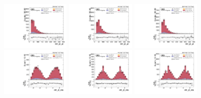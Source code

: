 \begin{figure}[!ht]
  \centering
  \includegraphics[width=0.30\textwidth]{analysis_plots/2016_zjj/cr_vjets_l/vbf_j2_pt.pdf}
  \includegraphics[width=0.30\textwidth]{analysis_plots/2017_zjj/cr_vjets_l/vbf_j2_pt.pdf}
  \includegraphics[width=0.30\textwidth]{analysis_plots/2018_zjj/cr_vjets_l/vbf_j2_pt.pdf} \\
  \includegraphics[width=0.30\textwidth]{analysis_plots/2016_zjj/cr_vjets_l/vbf_j2_eta.pdf}
  \includegraphics[width=0.30\textwidth]{analysis_plots/2017_zjj/cr_vjets_l/vbf_j2_eta.pdf}
  \includegraphics[width=0.30\textwidth]{analysis_plots/2018_zjj/cr_vjets_l/vbf_j2_eta.pdf} \\

\end{figure}
